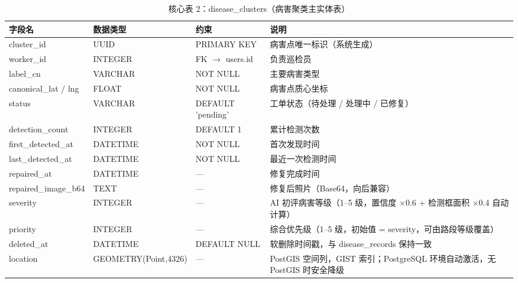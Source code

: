 \documentclass[UTF8, a4paper, fontset=ubuntu]{ctexart}
\begin{document}
\begin{table}[H]
    \centering
    \caption{核心表 2：disease\_clusters（病害聚类主实体表）}
    \begin{tabular}{lp{3cm}lp{5cm}}
        \toprule
        字段名 & 数据类型 & 约束 & 说明 \\ \midrule
        cluster\_id          & UUID     & PRIMARY KEY          & 病害点唯一标识（系统生成） \\
        worker\_id           & INTEGER  & FK $\rightarrow$ users.id        & 负责巡检员 \\
        label\_cn            & VARCHAR  & NOT NULL             & 主要病害类型 \\
        canonical\_lat / lng & FLOAT    & NOT NULL             & 病害点质心坐标 \\
        status               & VARCHAR  & DEFAULT 'pending'    & 工单状态（待处理 / 处理中 / 已修复） \\
        detection\_count     & INTEGER  & DEFAULT 1            & 累计检测次数 \\
        first\_detected\_at  & DATETIME & NOT NULL             & 首次发现时间 \\
        last\_detected\_at   & DATETIME & NOT NULL             & 最近一次检测时间 \\
        repaired\_at         & DATETIME & ---                  & 修复完成时间 \\
        repaired\_image\_b64 & TEXT     & ---                  & 修复后照片（Base64，向后兼容） \\
        severity             & INTEGER  & ---                  & AI 初评病害等级（1--5 级，置信度 $\times$0.6 + 检测框面积 $\times$0.4 自动计算） \\
        priority             & INTEGER  & ---                  & 综合优先级（1--5 级，初始值 = severity，可由路段等级覆盖） \\
        deleted\_at          & DATETIME & DEFAULT NULL         & 软删除时间戳，与 disease\_records 保持一致 \\
        location             & GEOMETRY(Point,4326) & ---        & PostGIS 空间列，GIST 索引；PostgreSQL 环境自动激活，无 PostGIS 时安全降级 \\
        \bottomrule
    \end{tabular}
\end{table}
\end{document}
